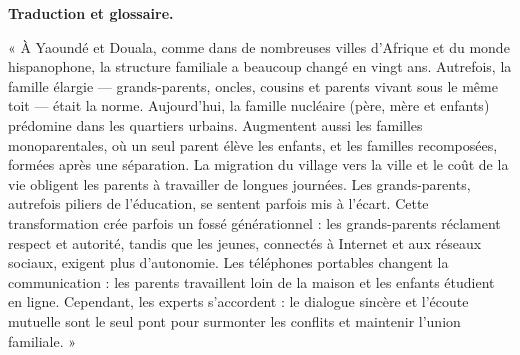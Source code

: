 \documentclass[11pt]{article}
\begin{document}
\textbf{Traduction et glossaire.}\par
« À Yaoundé et Douala, comme dans de nombreuses villes d'Afrique et du monde hispanophone, la structure familiale a beaucoup changé en vingt ans. Autrefois, la famille élargie — grands-parents, oncles, cousins et parents vivant sous le même toit — était la norme. Aujourd'hui, la famille nucléaire (père, mère et enfants) prédomine dans les quartiers urbains. Augmentent aussi les familles monoparentales, où un seul parent élève les enfants, et les familles recomposées, formées après une séparation. La migration du village vers la ville et le coût de la vie obligent les parents à travailler de longues journées. Les grands-parents, autrefois piliers de l'éducation, se sentent parfois mis à l'écart. Cette transformation crée parfois un fossé générationnel : les grands-parents réclament respect et autorité, tandis que les jeunes, connectés à Internet et aux réseaux sociaux, exigent plus d'autonomie. Les téléphones portables changent la communication : les parents travaillent loin de la maison et les enfants étudient en ligne. Cependant, les experts s'accordent : le dialogue sincère et l'écoute mutuelle sont le seul pont pour surmonter les conflits et maintenir l'union familiale. »
\end{document}
